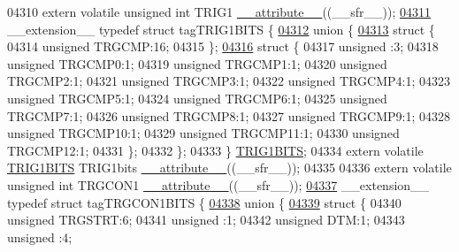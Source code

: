 \begin{DoxyCode}
04310 \textcolor{keyword}{extern} \textcolor{keyword}{volatile} \textcolor{keywordtype}{unsigned} \textcolor{keywordtype}{int}  TRIG1 \hyperlink{a00009_a493c46f03454991ccc5aa7a6e1dfb2a7}{\_\_attribute\_\_}((\_\_sfr\_\_));
\hypertarget{a00009_source_l04311}{}\hyperlink{a00008}{04311} \_\_extension\_\_ \textcolor{keyword}{typedef} \textcolor{keyword}{struct }tagTRIG1BITS \{
\hypertarget{a00009_source_l04312}{}\hyperlink{a00009}{04312}   \textcolor{keyword}{union }\{
\hypertarget{a00009_source_l04313}{}\hyperlink{a00009}{04313}     \textcolor{keyword}{struct }\{
04314       \textcolor{keywordtype}{unsigned} TRGCMP:16;
04315     \};
\hypertarget{a00009_source_l04316}{}\hyperlink{a00009}{04316}     \textcolor{keyword}{struct }\{
04317       \textcolor{keywordtype}{unsigned} :3;
04318       \textcolor{keywordtype}{unsigned} TRGCMP0:1;
04319       \textcolor{keywordtype}{unsigned} TRGCMP1:1;
04320       \textcolor{keywordtype}{unsigned} TRGCMP2:1;
04321       \textcolor{keywordtype}{unsigned} TRGCMP3:1;
04322       \textcolor{keywordtype}{unsigned} TRGCMP4:1;
04323       \textcolor{keywordtype}{unsigned} TRGCMP5:1;
04324       \textcolor{keywordtype}{unsigned} TRGCMP6:1;
04325       \textcolor{keywordtype}{unsigned} TRGCMP7:1;
04326       \textcolor{keywordtype}{unsigned} TRGCMP8:1;
04327       \textcolor{keywordtype}{unsigned} TRGCMP9:1;
04328       \textcolor{keywordtype}{unsigned} TRGCMP10:1;
04329       \textcolor{keywordtype}{unsigned} TRGCMP11:1;
04330       \textcolor{keywordtype}{unsigned} TRGCMP12:1;
04331     \};
04332   \};
04333 \} \hyperlink{a00008_de/d9d/a00813}{TRIG1BITS};
04334 \textcolor{keyword}{extern} \textcolor{keyword}{volatile} \hyperlink{a00008_de/d9d/a00813}{TRIG1BITS} TRIG1bits \hyperlink{a00009_a493c46f03454991ccc5aa7a6e1dfb2a7}{\_\_attribute\_\_}((\_\_sfr\_\_));
04335 
04336 \textcolor{keyword}{extern} \textcolor{keyword}{volatile} \textcolor{keywordtype}{unsigned} \textcolor{keywordtype}{int}  TRGCON1 \hyperlink{a00009_a493c46f03454991ccc5aa7a6e1dfb2a7}{\_\_attribute\_\_}((\_\_sfr\_\_));
\hypertarget{a00009_source_l04337}{}\hyperlink{a00008}{04337} \_\_extension\_\_ \textcolor{keyword}{typedef} \textcolor{keyword}{struct }tagTRGCON1BITS \{
\hypertarget{a00009_source_l04338}{}\hyperlink{a00009}{04338}   \textcolor{keyword}{union }\{
\hypertarget{a00009_source_l04339}{}\hyperlink{a00009}{04339}     \textcolor{keyword}{struct }\{
04340       \textcolor{keywordtype}{unsigned} TRGSTRT:6;
04341       \textcolor{keywordtype}{unsigned} :1;
04342       \textcolor{keywordtype}{unsigned} DTM:1;
04343       \textcolor{keywordtype}{unsigned} :4;

\end{DoxyCode}
